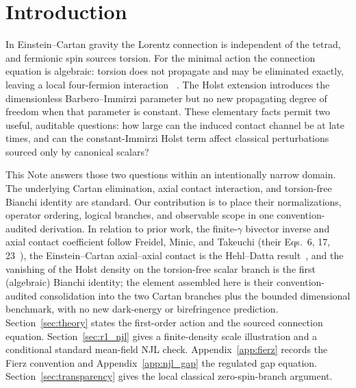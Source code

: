 \documentclass[aps,prd,twocolumn,superscriptaddress,preprintnumbers,nofootinbib,longbibliography,floatfix]{revtex4-2}
\begin{document}

\maketitle
\tableofcontents


\section{Introduction}\label{sec:intro}

In Einstein--Cartan gravity the Lorentz connection is independent of the
tetrad, and fermionic spin sources torsion.  For the minimal action the
connection equation is algebraic: torsion does not propagate and may be
eliminated exactly, leaving a local four-fermion interaction
~\cite{Hehl1976,HehlDattaNJL1971,Freidel2005}.  The Holst extension introduces
the dimensionless Barbero--Immirzi parameter but no new propagating degree of
freedom when that parameter is constant.  These elementary facts permit two
useful, auditable questions: how large can the induced contact channel be at
late times, and can the constant-Immirzi Holst term affect classical
perturbations sourced only by canonical scalars?

This Note answers those two questions within an intentionally narrow domain.
The underlying Cartan elimination, axial contact interaction, and torsion-free
Bianchi identity are standard.  Our contribution is to place their
normalizations, operator ordering, logical branches, and observable scope in
one convention-audited derivation.  In relation to prior work, the
finite-$\gamma$ bivector inverse and axial contact coefficient follow Freidel,
Minic, and Takeuchi (their Eqs.~6, 17, 23~\cite{Freidel2005}), the
Einstein--Cartan axial--axial contact is the Hehl--Datta
result~\cite{Hehl1976,HehlDattaNJL1971}, and the vanishing of the Holst density
on the torsion-free scalar branch is the first (algebraic) Bianchi identity;
the element assembled here is their convention-audited consolidation into the
two Cartan branches plus the bounded dimensional benchmark, with no new
dark-energy or birefringence prediction.  Section~\ref{sec:theory} states the
first-order action and the sourced connection equation.
Section~\ref{sec:r1_njl} gives a finite-density scale illustration and a
conditional standard mean-field NJL check.  Appendix~\ref{app:fierz} records
the Fierz convention and Appendix~\ref{app:njl_gap} the regulated gap equation.
Section~\ref{sec:transparency} gives the local classical zero-spin-branch
argument.
\end{document}
